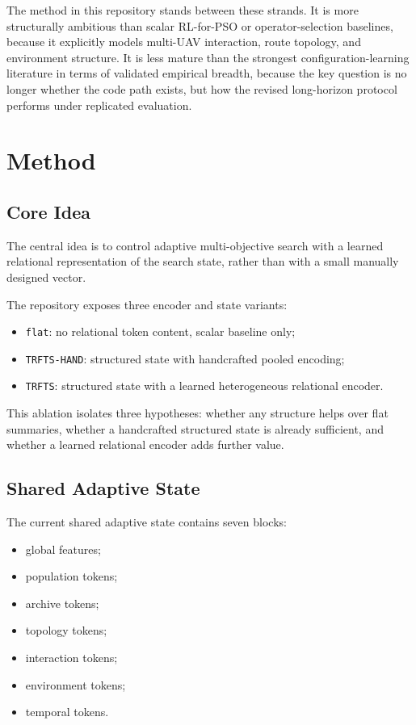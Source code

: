 \documentclass[a4paper,fleqn]{cas-sc}
\begin{document}
The method in this repository stands between these strands. It is more structurally ambitious than scalar RL-for-PSO or operator-selection baselines, because it explicitly models multi-UAV interaction, route topology, and environment structure. It is less mature than the strongest configuration-learning literature in terms of validated empirical breadth, because the key question is no longer whether the code path exists, but how the revised long-horizon protocol performs under replicated evaluation.

\section{Method}

\subsection{Core Idea}

The central idea is to control adaptive multi-objective search with a learned relational representation of the search state, rather than with a small manually designed vector.

The repository exposes three encoder and state variants:
\begin{itemize}
\item \texttt{flat}: no relational token content, scalar baseline only;
\item \texttt{TRFTS-HAND}: structured state with handcrafted pooled encoding;
\item \texttt{TRFTS}: structured state with a learned heterogeneous relational encoder.
\end{itemize}

This ablation isolates three hypotheses: whether any structure helps over flat summaries, whether a handcrafted structured state is already sufficient, and whether a learned relational encoder adds further value.

\subsection{Shared Adaptive State}

The current shared adaptive state contains seven blocks:
\begin{itemize}
\item global features;
\item population tokens;
\item archive tokens;
\item topology tokens;
\item interaction tokens;
\item environment tokens;
\item temporal tokens.
\end{itemize}
\end{document}
